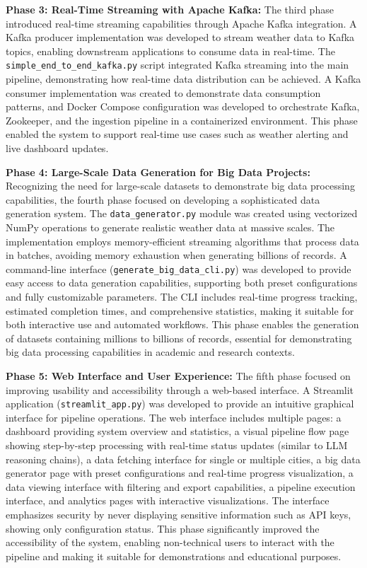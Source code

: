 \documentclass[12pt,a4paper]{article}
\begin{document}
\textbf{Phase 3: Real-Time Streaming with Apache Kafka:} The third phase introduced real-time streaming capabilities through Apache Kafka integration. A Kafka producer implementation was developed to stream weather data to Kafka topics, enabling downstream applications to consume data in real-time. The \texttt{simple\_end\_to\_end\_kafka.py} script integrated Kafka streaming into the main pipeline, demonstrating how real-time data distribution can be achieved. A Kafka consumer implementation was created to demonstrate data consumption patterns, and Docker Compose configuration was developed to orchestrate Kafka, Zookeeper, and the ingestion pipeline in a containerized environment. This phase enabled the system to support real-time use cases such as weather alerting and live dashboard updates.

\textbf{Phase 4: Large-Scale Data Generation for Big Data Projects:} Recognizing the need for large-scale datasets to demonstrate big data processing capabilities, the fourth phase focused on developing a sophisticated data generation system. The \texttt{data\_generator.py} module was created using vectorized NumPy operations to generate realistic weather data at massive scales. The implementation employs memory-efficient streaming algorithms that process data in batches, avoiding memory exhaustion when generating billions of records. A command-line interface (\texttt{generate\_big\_data\_cli.py}) was developed to provide easy access to data generation capabilities, supporting both preset configurations and fully customizable parameters. The CLI includes real-time progress tracking, estimated completion times, and comprehensive statistics, making it suitable for both interactive use and automated workflows. This phase enables the generation of datasets containing millions to billions of records, essential for demonstrating big data processing capabilities in academic and research contexts.

\textbf{Phase 5: Web Interface and User Experience:} The fifth phase focused on improving usability and accessibility through a web-based interface. A Streamlit application (\texttt{streamlit\_app.py}) was developed to provide an intuitive graphical interface for pipeline operations. The web interface includes multiple pages: a dashboard providing system overview and statistics, a visual pipeline flow page showing step-by-step processing with real-time status updates (similar to LLM reasoning chains), a data fetching interface for single or multiple cities, a big data generator page with preset configurations and real-time progress visualization, a data viewing interface with filtering and export capabilities, a pipeline execution interface, and analytics pages with interactive visualizations. The interface emphasizes security by never displaying sensitive information such as API keys, showing only configuration status. This phase significantly improved the accessibility of the system, enabling non-technical users to interact with the pipeline and making it suitable for demonstrations and educational purposes.
\end{document}
